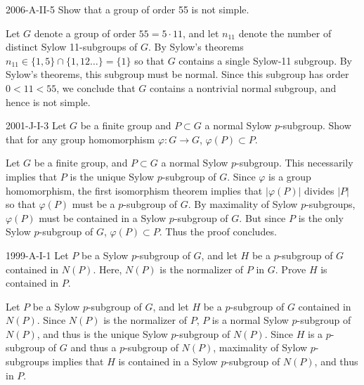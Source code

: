 \documentclass{article}
\begin{document}
	\begin{prb}{2006-A-II-5}
		Show that a group of order 55 is not simple. 
	\end{prb}
	Let $G$ denote a group of order $55 = 5 \cdot 11$, and let $n_{11}$ denote the number of distinct Sylow 11-subgroups of $G$. By Sylow's theorems $n_{11} \in \{1, 5\} \cap\{1, 12 \ldots\} = \{1\}$ so that $G$ contains a single Sylow-11 subgroup. By Sylow's theorems, this subgroup must be normal. Since this subgroup has order $0 < 11 < 55$, we conclude that $G$ contains a nontrivial normal subgroup, and hence is not simple. 
	
	\begin{prb}{2001-J-I-3}
		Let $G$ be a finite group and $P \subset G$ a normal Sylow $p$-subgroup. Show that for any group homomorphism $\varphi: G \to G$, $\varphi(P) \subset P$. 
	\end{prb}
	Let $G$ be a finite group, and $P \subset G$ a normal Sylow $p$-subgroup. This necessarily implies that $P$ is the unique Sylow $p$-subgroup of $G$. Since $\varphi$ is a group homomorphism, the first isomorphism theorem implies that $|\varphi(P)|$ divides $|P|$ so that $\varphi(P)$ must be a $p$-subgroup of $G$. By maximality of Sylow $p$-subgroups, $\varphi(P)$ must be contained in a Sylow $p$-subgroup of $G$. But since $P$ is the only Sylow $p$-subgroup of $G$, $\varphi(P) \subset P$. Thus the proof concludes. 
	
	\begin{prb}{1999-A-I-1}
		Let $P$ be a Sylow $p$-subgroup of $G$, and let $H$ be a $p$-subgroup of $G$ contained in $N(P)$. Here, $N(P)$ is the normalizer of $P$ in $G$. Prove $H$ is contained in $P$. 
	\end{prb}
	Let $P$ be a Sylow $p$-subgroup of $G$, and let $H$ be a $p$-subgroup of $G$ contained in $N(P)$. Since $N(P)$ is the normalizer of $P$, $P$ is a normal Sylow $p$-subgroup of $N(P)$, and thus is the unique Sylow $p$-subgroup of $N(P)$. Since $H$ is a $p$-subgroup of $G$ and thus a $p$-subgroup of $N(P)$, maximality of Sylow $p$-subgroups implies that $H$ is contained in a Sylow $p$-subgroup of $N(P)$, and thus in $P$.
	
\end{document}
